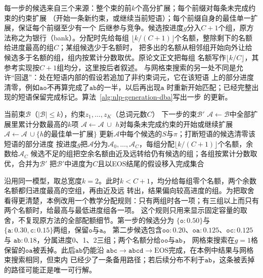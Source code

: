 每一步的候选来自三个来源：整个束的前$k$个高分扩展；每个前缀对每条未完成约束的约束扩展
（开始一条新约束，或继续当前短语）；每个前缀自身的最佳单一扩展，保证每个前缀至少有一个
后继参与竞争。候选按进度$g$分入$C+1$个组，原方法称之为银行（bank）。分配时先给每组
$\lfloor k/(C+1)\rfloor$个名额，整除剩下的名额给进度最高的组$C$；某组候选少于名额时，
把多出的名额从相邻组开始向外让给候选多于名额的组，组内按累计分数取优。原论文正文把每组
名额写作$\lfloor k/C\rfloor$，其参考实现按$C+1$组均分，这里按后者叙述。
与网格束搜索的另一处不同是允许“回退”：处在短语内部的假设若追加了非约束词元，它在该短语
上的部分进度清零，例如$\mathtt{ao}$不再算完成了$\mathtt{ab}$的一半，以后再出现$\mathtt a$
时重新开始匹配；已经完整出现的短语保留完成标记。算法~\ref{alg:nlp-generation-dba}写出一步
的更新。

\begin{algorithm}[动态束分配的一步更新]
  \label{alg:nlp-generation-dba}
  \begin{algorithmic}[1]
    \Require 当前束$\mathcal B$（$|\mathcal B|\leq k$），约束$z_1,\ldots,z_K$（总词元数$C$）
    \Ensure 下一步的束$\mathcal B'$
    \State $\mathcal A\gets\mathcal B$中全部扩展里累计分数最高的$k$项
      \State $\mathcal A\gets\mathcal A\,\cup$ $h$对每条未完成约束的开始或继续扩展
      \State $\mathcal A\gets\mathcal A\,\cup\{h\text{的最佳单一扩展}\}$
    \EndFor
    \State 更新$\mathcal A$中每个候选的$S$与$\pi$；打断短语的候选清零该短语的部分进度
    \State 按进度$g$把$\mathcal A$分为$\mathcal A_0,\ldots,\mathcal A_C$，每组分配$\lfloor k/(C+1)\rfloor$个名额，余数给$\mathcal A_C$
    \State 候选不足的组把空余名额由近及远转给仍有候选的组；各组按累计分数取优，合并为$\mathcal B'$
    \State 把$\mathcal B'$中进度为$C$且以EOS结尾的假设移入完成集合
  \end{algorithmic}
\end{algorithm}

沿用同一模型，取总宽度$k=2$。此时$k<C+1$，均分给每组零个名额，两个余数名额都归进度最高的空组，再由近及远
转出，结果偏向较高进度的组。为把取舍看得更清楚，本例改用一个教学分配规则：只有两组时各一项；有三组以上而只有两个名额时，给最高与最低进度组各一项。
这个规则只用来显示固定容量的取舍，不复现原方法的全部配额细节。第一步的候选分为
$\{\mathtt o:0.50\}$与$\{\mathtt a:0.30,\mathtt c:0.15\}$两组，保留$\mathtt o$与$\mathtt a$。
第二步候选包含$\mathtt{oo}:0.20$、$\mathtt{oa}:0.125$、$\mathtt{oc}:0.125$与
$\mathtt{ab}:0.18$，分属进度0、1、2三组；两个名额分给$\mathtt{oo}$与$\mathtt{ab}$，
网格束搜索在$g=1$格保留的$\mathtt{oa}$被丢掉。此后$\mathtt{ab}$仍能沿
$\mathtt{abc}\to\mathtt{abcd}\to\mathrm{EOS}$完成，在本例中结果与网格束搜索相同，但束内
已经少了一条备用路径；若后续分布不利于$\mathtt{ab}$，这条被丢掉的路径可能正是唯一可行解。

